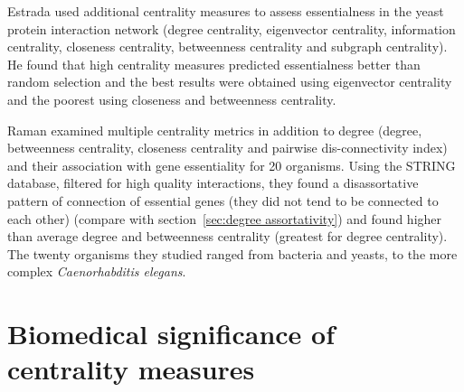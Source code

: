 Estrada \cite{estrada2006virtual} used additional centrality measures to assess essentialness in the yeast protein interaction network (degree centrality, eigenvector centrality, information centrality, closeness centrality, betweenness centrality and subgraph centrality). He found that high centrality measures predicted essentialness better than random selection and the best results were obtained using eigenvector centrality and the poorest using closeness and betweenness centrality. 

Raman \cite{raman2014organisational} examined multiple centrality metrics in addition to degree (degree, betweenness centrality, closeness centrality and pairwise dis-connectivity index) and their association with gene essentiality for 20 organisms. Using the STRING database, filtered for high quality interactions, they found a disassortative pattern of connection of essential genes (they did not tend to be connected to each other)  (compare with section~\ref{sec:degree assortativity})  and found higher than average degree and betweenness centrality (greatest for degree centrality). The twenty organisms they studied ranged from bacteria and yeasts, to the more complex \textit{Caenorhabditis elegans}.





\section{Biomedical significance of centrality measures}
 \label{sec:biomedical significance of centrality measures}
 
